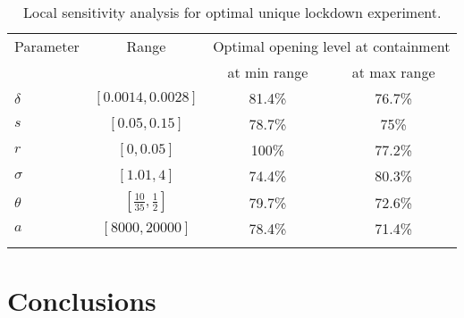 \documentclass{amsart}
\begin{document}
\begin{table}[htbp]
	\centering
	\caption{Local sensitivity analysis for optimal unique lockdown experiment.}
	\begin{tabular}{lccc}
	     \multicolumn{1}{c}{Parameter } & \multicolumn{1}{c}{Range} & \multicolumn{2}{c}{   Optimal opening level at containment} \\         
	     &  & \multicolumn{1}{c}{at min range} & \multicolumn{1}{c}{at max range}  \\ \hline \vspace{0.1cm}
		 $\delta$ & $[0.0014, 0.0028]$ & 81.4\% & 76.7\%  \\   \vspace{0.2cm}
		$s$ & $[0.05, 0.15]$ & 78.7\% & 75\%    \\   \vspace{0.2cm}
		$r$ & $[0, 0.05]$ & 100\% & 77.2\%   \\   \vspace{0.2cm}
		$\sigma$   & $[1.01, 4]$ & 74.4\% & 80.3\% \\   \vspace{0.2cm}
		$\theta$  & $[\frac{10}{35}, \frac{1}{2}]$ & 79.7\% & 72.6\%   \\   \vspace{0.2cm}
		$a$  & $[8000, 20000]$ & 78.4\% & 71.4\%  \\  \hline \vspace{0.2cm}
	\end{tabular}%
	\label{tab:local_sen_case1}%
\end{table}%


\newpage
\section{Conclusions}
\end{document}
